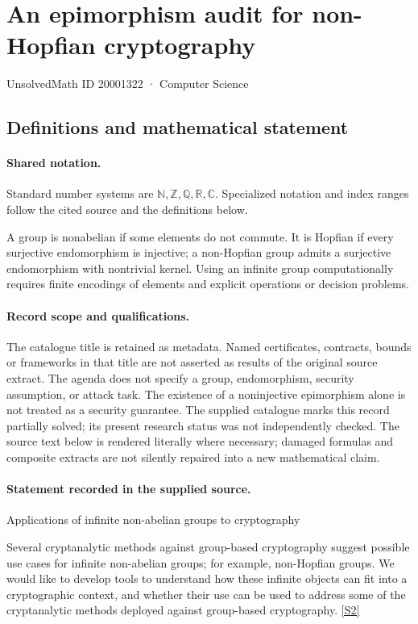 \documentclass[11pt]{article}
\newcommand{\sref}[2]{\hyperlink{source:#1:#2}{[S#2]}}
\begin{document}
\setcounter{section}{20001321}
\section{An epimorphism audit for non-Hopfian cryptography}\label{20001322}
{\small\sffamily UnsolvedMath ID 20001322 · Computer Science}
\subsection{Definitions and mathematical statement}

\paragraph{Shared notation.}Standard number systems are $\mathbb N,\mathbb Z,\mathbb Q,\mathbb R,\mathbb C$. Specialized notation and index ranges follow the cited source and the definitions below.


A group is nonabelian if some elements do not commute. It is Hopfian if every surjective endomorphism is injective; a non-Hopfian group admits a surjective endomorphism with nontrivial kernel. Using an infinite group computationally requires finite encodings of elements and explicit operations or decision problems.
\paragraph{Record scope and qualifications.}
The catalogue title is retained as metadata. Named certificates, contracts, bounds or frameworks in that title are not asserted as results of the original source extract.
The agenda does not specify a group, endomorphism, security assumption, or attack task. The existence of a noninjective epimorphism alone is not treated as a security guarantee. The supplied catalogue marks this record partially solved; its present research status was not independently checked.
The source text below is rendered literally where necessary; damaged formulas and composite extracts are not silently repaired into a new mathematical claim.
\paragraph{Statement recorded in the supplied source.}
Applications of infinite non-abelian groups to cryptography

Several cryptanalytic methods against group-based cryptography suggest possible use cases for infinite non-abelian groups; for example, non-Hopfian groups. We would like to develop tools to understand how these infinite objects can fit into a cryptographic context, and whether their use can be used to address some of the cryptanalytic methods deployed against group-based cryptography. \sref{20001322}{2}
\end{document}
